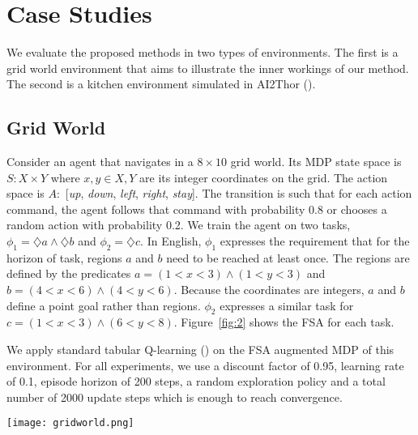 \documentclass{article}
\begin{document}
\section{Case Studies}
\label{sec:case_studies}

We evaluate the proposed methods in two types of environments. The first is a grid world environment that aims to illustrate the inner workings of our method. The second is a kitchen environment simulated in AI2Thor (\cite{ai2thor}). 

\subsection{Grid World}
\label{subsec:grid_world}


Consider an agent that navigates in a $8 \times 10$ grid world. Its MDP state space is $S: X \times Y $ where $x,y \in X, Y$ are its integer coordinates on the grid. The action space is $A:$ [\textit{up}, \textit{down}, \textit{left}, \textit{right}, \textit{stay}]. The transition is such that for each action command, the agent follows that command with probability 0.8 or chooses a random action with probability 0.2. We train the agent on two tasks, $\phi_1=\diamondsuit a \wedge \diamondsuit b$ and $\phi_2=\diamondsuit c$. In English, $\phi_1$ expresses the requirement that for the horizon of task, regions $a$ and $b$ need to be reached at least once. The regions are defined by the predicates $a=(1<x<3) \wedge (1<y<3)$ and $b=(4<x<6) \wedge (4<y<6)$. Because the coordinates are integers, $a$ and $b$ define a point goal rather than regions. $\phi_2$ expresses a similar task for $c=(1<x<3) \wedge (6<y<8)$. Figure~\ref{fig:2} shows the FSA for each task. 

We apply standard tabular Q-learning (\cite{Watkins}) on the FSA augmented MDP of this environment. For all experiments, we use a discount factor of 0.95, learning rate of 0.1, episode horizon of 200 steps, a random exploration policy and a total number of 2000 update steps which is enough to reach convergence.

\begin{figure*}%
\vspace{-0.1in}
\begin{center}
\texttt{[image: gridworld.png]}
\vspace{-0.1in}
\caption{FSA and policy for \textbf{(a)} $\phi_1=\diamondsuit a \wedge \diamondsuit b$. \textbf{(b)} $\phi_2=\diamondsuit c$. \textbf{(c)} $\phi = \phi_1 \wedge \phi_2$. The agent moves in a $8 \times 10$ gridworld with 3 labeled regions. The agent has actions [\textit{up}, \textit{down}, \textit{left}, \textit{right}, \textit{stay}] where the directional actions are represented by arrows, \textit{stay} is represented by the blue dot.}\label{fig:2}
\end{center}
\end{figure*}
\end{document}

